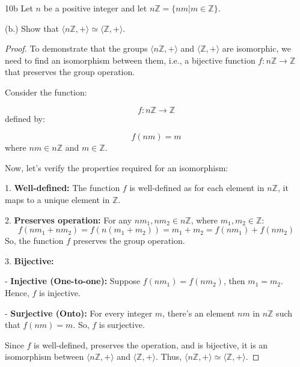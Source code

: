 \documentclass[12pt]{amsart}
\theoremstyle{definition}
\numberwithin{equation}{section}
\theoremstyle{plain}
\newcommand{\Z}{\mathbb{Z}}
\begin{document}
    \begin{exercise}{10b}
        Let $n$ be a positive integer and let $n\Z = \{nm | m \in \Z\}$.

        (b.) Show that $\langle n\Z, + \rangle \simeq \langle \Z, + \rangle$.
        \begin{proof}
            To demonstrate that the groups \( \langle n\mathbb{Z}, + \rangle \) and \( \langle \mathbb{Z}, + \rangle \) are isomorphic, we need to find an isomorphism between them, i.e., a bijective function \( f: n\mathbb{Z} \rightarrow \mathbb{Z} \) that preserves the group operation.

            Consider the function:

            \[ f: n\mathbb{Z} \rightarrow \mathbb{Z} \]
            defined by:

            \[ f(nm) = m \]
            where \( nm \in n\mathbb{Z} \) and \( m \in \mathbb{Z} \).
            
            Now, let's verify the properties required for an isomorphism:
            
            1. \textbf{Well-defined:} The function \( f \) is well-defined as for each element in \( n\mathbb{Z} \), it maps to a unique element in \( \mathbb{Z} \).
            
            2. \textbf{Preserves operation:} 
            For any \( nm_1, nm_2 \in n\mathbb{Z} \), where \( m_1, m_2 \in \mathbb{Z} \):
            \[ f(nm_1 + nm_2) = f(n(m_1+m_2)) = m_1+m_2 = f(nm_1) + f(nm_2) \]
            So, the function \( f \) preserves the group operation.
            
            3. \textbf{Bijective:}

               - \textbf{Injective (One-to-one):} Suppose \( f(nm_1) = f(nm_2) \), then \( m_1 = m_2 \). Hence, \( f \) is injective.

               - \textbf{Surjective (Onto):} For every integer \( m \), there's an element \( nm \) in \( n\mathbb{Z} \) such that \( f(nm) = m \). So, \( f \) is surjective.
            
            Since \( f \) is well-defined, preserves the operation, and is bijective, it is an isomorphism between \( \langle n\mathbb{Z}, + \rangle \) and \( \langle \mathbb{Z}, + \rangle \). Thus, \( \langle n\mathbb{Z}, + \rangle \simeq \langle \mathbb{Z}, + \rangle \).
        \end{proof}
    \end{exercise}
    
\end{document}
